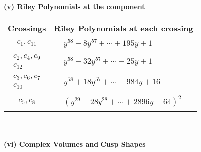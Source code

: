 \documentclass[1p]{elsarticle_modified}
\theoremstyle{definition}
\begin{document}
\newpage\renewcommand{\arraystretch}{1}
\flushleft \textbf{(v) Riley Polynomials at the component}\newline \\
\begin{tabular}{m{50pt}|m{274pt}}
Crossings & \hspace{64pt}Riley Polynomials at each crossing \\
\hline $$\begin{aligned}c_{1},c_{11}\end{aligned}$$&$\begin{aligned}
&y^{58}-8 y^{57}+\cdots+195 y+1
\end{aligned}$\\
\hline $$\begin{aligned}c_{2},c_{4},c_{9}\\c_{12}\end{aligned}$$&$\begin{aligned}
&y^{58}-32 y^{57}+\cdots-25 y+1
\end{aligned}$\\
\hline $$\begin{aligned}c_{3},c_{6},c_{7}\\c_{10}\end{aligned}$$&$\begin{aligned}
&y^{58}+18 y^{57}+\cdots-984 y+16
\end{aligned}$\\
\hline $$\begin{aligned}c_{5},c_{8}\end{aligned}$$&$\begin{aligned}
&(y^{29}-28 y^{28}+\cdots+2896 y-64)^{2}
\end{aligned}$\\
\hline
\end{tabular}\\~\\
\newpage\flushleft \textbf{(vi) Complex Volumes and Cusp Shapes}
\end{document}
